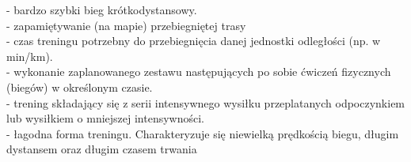 	 - bardzo szybki bieg krótkodystansowy.\\
	 - zapamiętywanie (na mapie) przebiegniętej trasy\\
	 - czas treningu potrzebny do przebiegnięcia danej jednostki odległości (np. w min/km).\\
	 - wykonanie zaplanowanego zestawu następujących po sobie ćwiczeń fizycznych (biegów) w określonym czasie. \\
	 - trening składający się z serii intensywnego wysiłku przeplatanych odpoczynkiem lub wysiłkiem o mniejszej intensywności.\\
	 - łagodna forma treningu. Charakteryzuje się niewielką prędkością biegu, długim dystansem oraz długim czasem trwania\\
